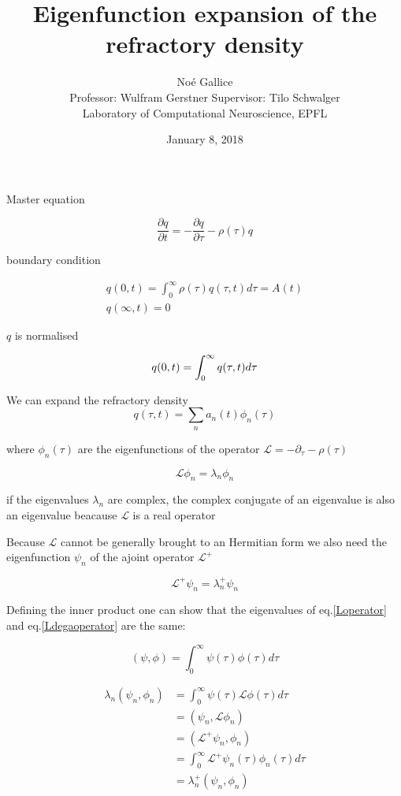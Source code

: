 \documentclass[a4paper,12pt,twoside]{article}
\title{Eigenfunction expansion of the refractory density}
\author{No\'e Gallice \\ Professor: Wulfram Gerstner \hspace{0.5cm}  Supervisor: Tilo Schwalger\\ \small{ Laboratory of Computational Neuroscience, EPFL }
}
\date{January 8, 2018}
\def \be {\begin{equation}}
\def \ee {\end{equation}}
\begin{document}
\maketitle

\tableofcontents %

\baselineskip=16pt
\parindent=15pt
\parskip=5pt


%
%
\newpage

Master equation

\be
\label{masterequation}
\frac{\partial q}{\partial t}=-\frac{\partial q}{\partial \tau}-\rho(\tau)q
\ee

boundary condition

\begin{align}
\label{boundarycondition}
q(0,t)=\int_{0}^{\infty}\rho(\tau)q(\tau,t)d\tau=A(t) \\
q(\infty,t)=0
\end{align}

$q$ is normalised 

\be
\label{nomalisation}
q(0,t)=\int_{0}^{\infty}q(\tau,t)d\tau \\
\ee


We can expand the refractory density
\be
\label{refractoryexpansion}
q(\tau,t)=\sum_n a_n(t)\phi_n(\tau)
\ee

where $\phi_n(\tau)$ are the eigenfunctions of the operator $\mathcal{L}=-\partial_{\tau}-\rho(\tau)$


\be
\label{Loperator}
\mathcal{L}\phi_n=\lambda_n\phi_n
\ee

if the eigenvalues $\lambda_n$ are complex, the complex conjugate of an eigenvalue is also an eigenvalue beacause $\mathcal{L}$ is a real operator

Because $\mathcal{L}$ cannot be generally brought to an Hermitian form we also need  the eigenfunction $\psi_n$ of the ajoint operator  $\mathcal{L}^{+}$

\be
\label{Ldegaoperator}
\mathcal{L}^+\psi_n=\lambda_n^+\psi_n
\ee

Defining the inner product one can show that the eigenvalues of eq.\eqref{Loperator} and eq.\eqref{Ldegaoperator} are the same:

\be
(\psi,\phi)=\int_{0}^{\infty}\psi(\tau)\phi(\tau)d\tau
\ee

\begin{align}
\lambda_n(\psi_n,\phi_n) &=\int_{0}^{\infty}\psi(\tau)\mathcal{L}\phi(\tau)d\tau  \nonumber \\
&=(\psi_n,\mathcal{L}\phi_n)  \nonumber \\
&=(\mathcal{L}^+\psi_n,\phi_n)  \nonumber \\
&=\int_{0}^{\infty}\mathcal{L}^+\psi_n(\tau)\phi_n(\tau)d\tau  \nonumber \\
&=\lambda_n^+(\psi_n,\phi_n) \label{lndega}
\end{align}
\end{document}
